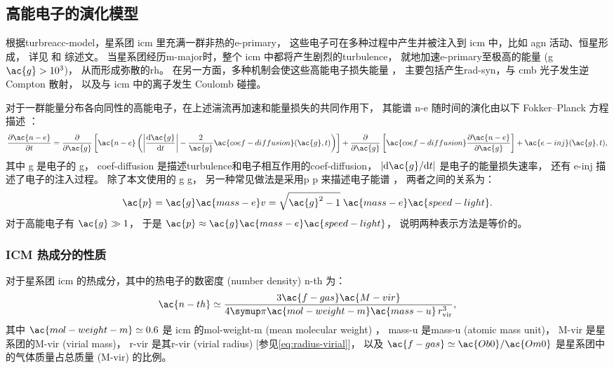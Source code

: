 \subsection{高能电子的演化模型}
\label{sec:halo-evo}

根据\ac{turbreacc-model}，星系团 \ac{icm} 里充满一群非热的\ac{e-primary}，
这些电子可在多种过程中产生并被注入到 \ac{icm} 中，比如 \ac{agn} 活动、恒星形成，
详见  和  综述文。
当星系团经历\ac{m-major}时，整个 \ac{icm} 中都将产生剧烈的\ac{turbulence}，
就地加速\ac{e-primary}至极高的能量 (\acl{g} $\ac{g} > \num{e3}$)，
从而形成弥散的\ac{rh}。
在另一方面，多种机制会使这些高能电子损失能量 \cite{sarazin1999}，
主要包括产生\ac{rad-syn}，与 \ac{cmb} 光子发生逆 Compton 散射，
以及与 \ac{icm} 中的离子发生 Coulomb 碰撞。

对于一群能量分布各向同性的高能电子，在上述湍流再加速和能量损失的共同作用下，
其能谱 \ac{n-e} 随时间的演化由以下 Fokker--Planck 方程描述
\cite{eilek1991,schlickeiser2002}：
\begin{equation}
  \label{eq:fokkerplanck}
  \pdiff{\ac{n-e}}{t} =
    \pdiff{}{\ac{g}} \left[ \ac{n-e} \left(
      \left| \diff{\ac{g}}{t} \right| -
      \frac{2}{\ac{g}} \ac{coef-diffusion}(\ac{g}, t) \right) \right]
    + \pdiff{}{\ac{g}} \left[
      \ac{coef-diffusion} \pdiff{\ac{n-e}}{\ac{g}} \right]
    + \ac{e-inj}(\ac{g}, t) ,
\end{equation}
其中
\ac{g} 是电子的 \acl{g}，
\ac{coef-diffusion} 是描述\ac{turbulence}和电子相互作用的\acl{coef-diffusion}，
$|\R{d}\ac{g} / \R{d}t|$ 是电子的能量损失速率，
还有 \ac{e-inj} 描述了电子的注入过程。
除了本文使用的 \acl{g} \ac{g}，
另一种常见做法是采用\acl{p} \ac{p} 来描述电子能谱 \cite{cassano2005,donnert2014}，
两者之间的关系为：
\begin{equation}
  \ac{p} = \ac{g} \ac{mass-e} v
    = \sqrt{\ac{g}^2 - 1} \; \ac{mass-e} \ac{speed-light} .
\end{equation}
对于高能电子有 $\ac{g} \gg 1$，
于是 $\ac{p} \approx \ac{g} \ac{mass-e} \ac{speed-light}$，
说明两种表示方法是等价的。

\subsubsection{ICM 热成分的性质}

对于星系团 \ac{icm} 的热成分，其中的热电子的数密度 (number density) \ac{n-th} 为：
\begin{equation}
  \label{eq:n-th}
  \ac{n-th} \simeq
    \frac{3 \ac{f-gas} \ac{M-vir}}{
      4\Cpi \ac{mol-weight-m} \ac{mass-u} \,r^3_{\R{vir}}} ,
\end{equation}
其中
$\ac{mol-weight-m} \simeq 0.6$ 是 \ac{icm} 的\acl{mol-weight-m}
(mean molecular weight) \cite{ettori2013}，
\ac{mass-u} 是\acl{mass-u} (atomic mass unit)，
\ac{M-vir} 是星系团的\acl{M-vir} (virial mass)，
\ac{r-vir} 是其\acl{r-vir} (virial radius)
[参见\autoref{eq:radius-virial}]，
以及 $\ac{f-gas} \simeq \ac{Ob0}/\ac{Om0}$
是星系团中的气体质量占总质量 (\ac{M-vir}) 的比例。

